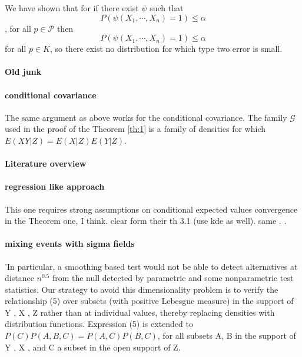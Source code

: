 \documentclass{article}
\begin{document}
We have shown that for if there exist $\psi$ such that 
$$P(\psi(X_1,\cdots, X_n) = 1) \leq \alpha$$,
for all $p \in \mathcal{P}$ then 
\[
 P(\psi(X_1,\cdots, X_n) = 1) \leq \alpha
\]
for all $p \in K$, so there exist no distribution for which type two error is small.  










\paragraph{Old junk}






\paragraph{conditional covariance}
The same argument as above works for the conditional covariance. The family $\mathcal G$ used in the proof of the Theorem \ref{th:1} is a family of densities for which $E(XY|Z)=E(X|Z)E(Y|Z)$. 

\paragraph{Literature overview}

\paragraph{regression like approach}
This one \cite{song2007testing} requires strong assumptions on conditional  expected values convergence in the Theorem one, I think. \cite{su2008nonparametric} clear form their th 3.1 (use kde as well). same \cite{fukumizu2007kernel,zhang2012kernel}.
\cite{huang2010testing}.


\paragraph{mixing events with sigma fields}
\cite{gyorfi2012strongly}


\cite{linton1996conditional} 'In particular, a smoothing based test would not be able to detect
alternatives at distance $n^{0.5}$ from the null detected by parametric and
some nonparametric test statistics.
Our strategy to avoid this dimensionality problem is to verify the
relationship (5) over subsets (with positive Lebesgue measure) in the
support of Y , X , Z rather than at individual values, thereby replacing
densities with distribution functions. Expression (5) is extended to
$P (C )P (A,B, C ) = P (A,C )P (B,C )$,
for all subsets A, B in the support of Y , X , and C a subset in the open
support of Z.
\end{document}

